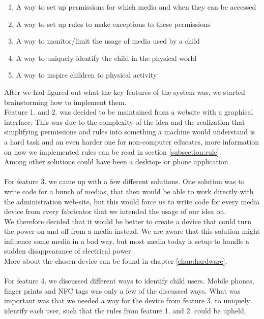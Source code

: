 \begin{enumerate}
	\item A way to set up permissions for which media and when they can be accessed
	\item A way to set up rules to make exceptions to these permissions
	\item A way to monitor/limit the usage of media used by a child
	\item A way to uniquely identify the child in the physical world
	\item A way to inspire children to physical activity
\end{enumerate}

After we had figured out what the key features of the system was, we started brainstorming how to implement them.\\
Feature 1. and 2. was decided to be maintained from a website with a graphical interface. This was due to the complexity of the idea and the realization that simplifying permissions and rules into something a machine would understand is a hard task and an even harder one for non-computer educates, more information on how we implemented rules can be read in section \vref{subsection:rule}.\\
Among other solutions could have been a desktop- or phone application.\\
\\
For feature 3. we came up with a few different solutions. One solution was to write code for a bunch of medias, that then would be able to work directly with the administration web-site, but this would force us to write code for every media device from every fabricator that we intended the usage of our idea on.\\
We therefore decided that it would be better to create a device that could turn the power on and off from a media instead. We are aware that this solution might influence some media in a bad way, but most media today is setup to handle a sudden disappearance of electrical power.\\
More about the chosen device can be found in chapter \vref{chap:hardware}.\\
\\
For feature 4. we discussed different ways to identify child users. Mobile phones, finger prints and NFC tags was only a few of the discussed ways. What was important was that we needed a way for the device from feature 3. to uniquely identify each user, such that the rules from feature 1. and 2. could be upheld.\\
